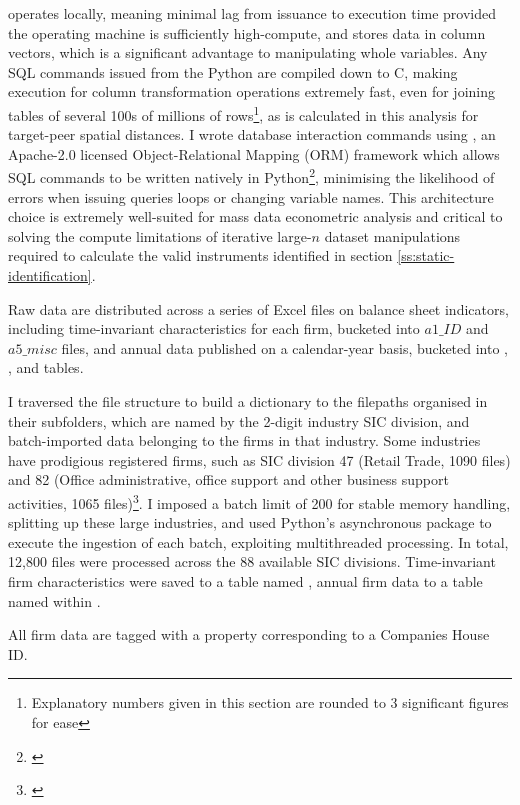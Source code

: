  operates locally, meaning minimal lag from issuance to execution time
provided the operating machine is sufficiently high-compute,
and stores data in column vectors, which is a significant advantage
to manipulating whole variables.
Any SQL commands issued from the Python are compiled down to C,
making execution for column transformation operations extremely fast,
even for joining tables of several 100s of millions of rows\footnote{Explanatory
numbers given in this section are rounded to 3 significant figures for ease},
as is calculated in this analysis for target-peer spatial distances.
I wrote database interaction commands using ,
an Apache-2.0 licensed Object-Relational Mapping (ORM) framework
which allows SQL commands to be written natively in Python\footnote{\cite{TheIbisProjectAuthors2026}},
minimising the likelihood of errors when issuing queries loops or changing variable names.
This architecture choice is extremely well-suited for mass data econometric analysis
and critical to solving the compute limitations of iterative large-$n$ dataset manipulations
required to calculate the valid instruments identified in section \ref{ss:static-identification}.
\par
Raw data are distributed across a series of Excel files on balance sheet indicators,
including time-invariant characteristics for each firm, bucketed into $a1\_ID$ and $a5\_misc$ files,
and annual data published on a calendar-year basis,
bucketed into , , and  tables.
\par
I traversed the file structure to build a dictionary to the filepaths organised in their subfolders,
which are named by the 2-digit industry SIC division,
and batch-imported data belonging to the firms in that industry.
Some industries have prodigious registered firms,
such as SIC division 47 (Retail Trade, 1090 files)
and 82 (Office administrative, office support and other business support activities,
1065 files)\footnote{\cite{ons2026:sic}}.
I imposed a batch limit of 200 for stable memory handling, splitting up these large industries,
and used Python's asynchronous  package
to execute the ingestion of each batch, exploiting multithreaded processing.
In total, 12,800 files were processed across the 88 available SIC divisions.
Time-invariant firm characteristics were saved to a table named ,
annual firm data to a table named  within .
\par
All firm data are tagged with a  property corresponding to a Companies House ID.
